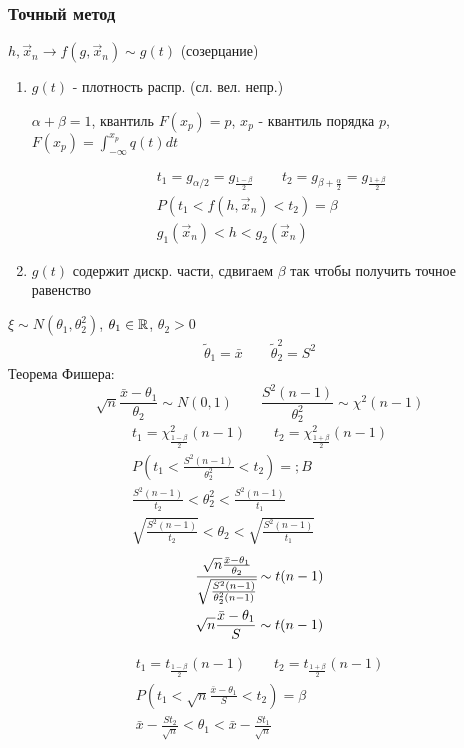 \documentclass{article}
\begin{document}
\subsubsection{Точный метод}
$h, \vec{x}_n \to f(g,\vec{x}_n) \sim g(t)$ (созерцание)
\begin{enumerate}
  \item $g(t)$ - плотность распр. (сл. вел. непр.)

    $\alpha+\beta=1$, квантиль $F(x_{p})=p$, $x_p$ - квантиль порядка $p$, $F(x_p)=\int_{-\infty}^{x_p}q(t)dt$

    \begin{gather*}
      t_1=g_{\alpha/2}=g_{\frac{1-\beta}{2}} \qquad t_2=g_{\beta+\frac{\alpha}{2}}=g_{\frac{1+\beta}{2}} \\ 
      P(t_1<f(h,\vec{x}_n)<t_2)=\beta \\ 
      g_1(\vec{x}_n) < h < g_2(\vec{x}_n)
    \end{gather*}
  \item $g(t)$ содержит дискр. части, сдвигаем $\beta$ так чтобы получить точное равенство
\end{enumerate}
\begin{eg}
  $\xi\sim N(\theta_1, \theta_2^{2})$, $\theta_1\in \mathbb{R}$, $\theta_2>0$
  \begin{gather*}
    \tilde{\theta}_1=\bar{x} \qquad \tilde{\theta}_{2}^{2}=S^{2}
  \end{gather*}
  Теорема Фишера:
  \[
    \sqrt{n}\frac{\bar{x}-\theta_1}{\theta_2} \sim N(0,1) \qquad \frac{S^{2}(n-1)}{\theta_2^{2}} \sim \chi^{2}(n-1) 
  \]
  \begin{gather*}
    t_1=\chi^{2}_{\frac{1-\beta}{2}}(n-1) \qquad t_2=\chi^{2}_{\frac{1+\beta}{2}}(n-1)  \\ 
    P(t_1<\frac{S^{2}(n-1)}{\theta_2^{2}}<t_2) = ;B \\ 
    \frac{S^{2}(n-1)}{t_2} < \theta^{2}_2 < \frac{S^{2}(n-1)}{t_1} \\
    \sqrt{\frac{S^{2}(n-1)}{t_2}} < \theta_2 < \sqrt{\frac{S^{2}(n-1)}{t_1}}
  \end{gather*}
  \begin{gather*}
    \cfrac{\sqrt{n}\frac{\bar{x}-\theta_1}{\theta_2}}{\sqrt{\frac{S^{2}(n-1)}{\theta_2^{2}(n-1)}}} \sim t(n-1) \\ 
    \sqrt{n}\frac{\bar{x}-\theta_1}{S} \sim t(n-1)
  \end{gather*}

  \begin{gather*}
    t_1=t_{\frac{1-\beta}{2}}(n-1) \qquad t_2=t_{\frac{1+\beta}{2}}(n-1) \\ 
    P(t_1 < \sqrt{n}\frac{\bar{x}-\theta_1}{S} < t_2)= \beta \\ 
    \bar{x}-\frac{S t_2}{\sqrt{n}} < \theta_1 < \bar{x} - \frac{S t_1}{\sqrt{n}}
  \end{gather*}
\end{eg}
\end{document}
